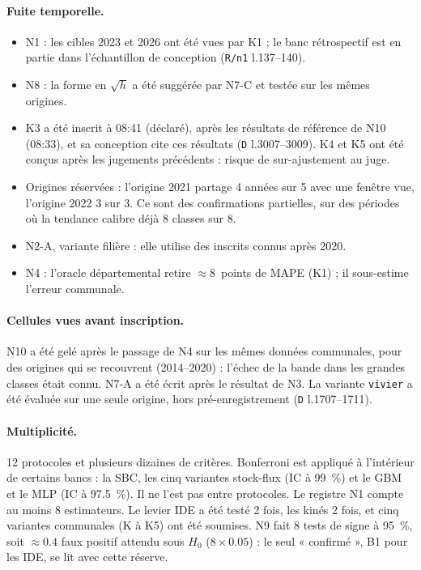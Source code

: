 \paragraph{Fuite temporelle.}
\begin{itemize}
  \item N1 : les cibles 2023 et 2026 ont été vues par K1 ; le banc rétrospectif est en partie dans
        l'échantillon de conception (\texttt{R/n1} l.137--140).
  \item N8 : la forme en $\sqrt h$ a été suggérée par N7-C et testée sur les mêmes origines.
  \item K3 a été inscrit à 08:41 (déclaré), après les résultats de référence de N10 (08:33\mesure),
        et sa conception cite ces résultats (\texttt{D} l.3007--3009). K4 et K5 ont été conçus
        après les jugements précédents : risque de sur-ajustement au juge.
  \item Origines réservées : l'origine 2021 partage 4\derive{} années sur 5 avec une fenêtre vue,
        l'origine 2022 3\derive{} sur 3. Ce sont des confirmations partielles, sur des périodes
        où la tendance calibre déjà 8\mesure{} classes sur 8.
  \item N2-A, variante filière : elle utilise des inscrits connus après 2020.
  \item N4 : l'oracle départemental retire $\approx 8$\mesure{}~points de MAPE (K1) ; il sous-estime
        l'erreur communale.
\end{itemize}

\paragraph{Cellules vues avant inscription.} N10 a été gelé après le passage de N4 sur les mêmes
données communales, pour des origines qui se recouvrent (2014--2020) : l'échec de la bande dans les
grandes classes était connu. N7-A a été écrit après le résultat de N3. La variante \texttt{vivier}
a été évaluée sur une seule origine, hors pré-enregistrement (\texttt{D} l.1707--1711).

\paragraph{Multiplicité.} 12\mesure{} protocoles et plusieurs dizaines de critères. Bonferroni est
appliqué à l'intérieur de certains bancs : la SBC, les cinq variantes stock-flux (IC à 99~\%) et le
GBM et le MLP (IC à \num{97.5}~\%). Il ne l'est pas entre protocoles. Le registre N1 compte au moins 8\mesure{}
estimateurs. Le levier IDE a été testé 2\mesure{} fois, les kinés 2\mesure{} fois, et cinq
variantes communales (K à K5) ont été soumises. N9 fait 8\mesure{} tests de signe à 95~\%, soit
$\approx \num{0.4}$\derive{} faux positif attendu sous $H_0$ ($8 \times \num{0.05}$) : le seul
« confirmé », B1 pour les IDE, se lit avec cette réserve.

